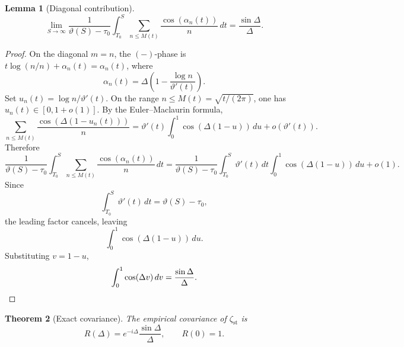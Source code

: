 \documentclass[11pt]{article}
\numberwithin{equation}{section}
\theoremstyle{plain}
\newtheorem{theorem}{Theorem}[section]
\newtheorem{lemma}[theorem]{Lemma}
\theoremstyle{definition}
\begin{document}
\begin{lemma}[Diagonal contribution]
\[
\lim_{S\to\infty}
\frac{1}{\vartheta(S)-\tau_0}
\int_{T_0}^S
\sum_{n\le M(t)}
\frac{\cos(\alpha_n(t))}{n}
\,dt
=
\frac{\sin\Delta}{\Delta}.
\]
\end{lemma}

\begin{proof}
On the diagonal \(m=n\), the \((-)\)-phase is \(t\log(n/n)+\alpha_n(t)=\alpha_n(t)\),
where
\[
\alpha_n(t)=\Delta\!\left(1-\frac{\log n}{\vartheta'(t)}\right).
\]
Set \(u_n(t)=\log n/\vartheta'(t)\). On the range \(n\le M(t)=\sqrt{t/(2\pi)}\), one
has \(u_n(t)\in[0,1+o(1)]\). By the Euler--Maclaurin formula,
\[
\sum_{n\le M(t)}\frac{\cos(\Delta(1-u_n(t)))}{n}
=\vartheta'(t)\int_0^1\cos(\Delta(1-u))\,du+o(\vartheta'(t)).
\]
Therefore
\[
\frac{1}{\vartheta(S)-\tau_0}
\int_{T_0}^S
\sum_{n\le M(t)}\frac{\cos(\alpha_n(t))}{n}\,dt
=
\frac{1}{\vartheta(S)-\tau_0}
\int_{T_0}^S
\vartheta'(t)\,dt\int_0^1\cos(\Delta(1-u))\,du
+o(1).
\]
Since
\[
\int_{T_0}^S\vartheta'(t)\,dt=\vartheta(S)-\tau_0,
\]
the leading factor cancels, leaving
\[
\int_0^1\cos(\Delta(1-u))\,du.
\]
Substituting \(v=1-u\),
\[
\int_0^1\cos(\Delta v)\,dv=\frac{\sin\Delta}{\Delta}.
\qedhere
\]
\end{proof}

\begin{theorem}[Exact covariance]
\label{thm:covariance}
The empirical covariance of \(\zeta_{\mathrm{st}}\) is
\begin{equation}
R(\Delta)=e^{-i\Delta}\frac{\sin\Delta}{\Delta},
\qquad
R(0)=1.
\label{eq:R-final}
\end{equation}
\end{theorem}
\end{document}
